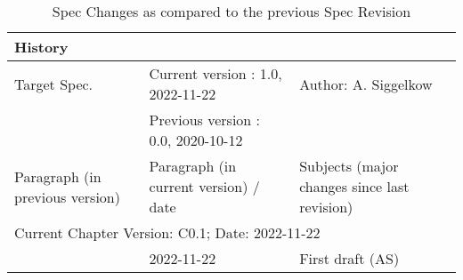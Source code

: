\begin{table}[H]
\caption{Spec Changes as compared to the previous \aschip \; Spec Revision}
\label{tab:docover_history01}
\centering
\begin{tabularx}{\textwidth}{|X |X |X |}
  \hline
  \multicolumn{3}{|l|}{History} \\
  \hline
  \multicolumn{1}{|l}{Target Spec.} & \multicolumn{1}{l}{Current version : 1.0, 2022-11-22} & \multicolumn{1}{l|}{Author: A. Siggelkow}\\
  \multicolumn{1}{|l}{ } & \multicolumn{1}{l}{Previous version : 0.0, 2020-10-12} & \multicolumn{1}{l|}{ }\\
  \hline
  \hline
  Paragraph (in previous version) & Paragraph (in current version) / date & Subjects (major changes since last revision) \\
  \hline
  \hline
  \multicolumn{3}{|l|}{Current Chapter Version: C0.1; Date: 2022-11-22} \\
  \hline
  & 2022-11-22 & First draft (AS) \\
  \hline
\end{tabularx}
\end{table}

